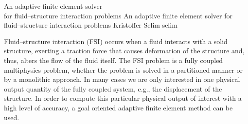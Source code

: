 \bgroup

\setcounter{chapter}{28}
\setcounter{chpnum}{28}

              {An adaptive finite element solver\\ for fluid--structure interaction problems}
              {An adaptive finite element solver for fluid--structure interaction problems}
              {Kristoffer Selim}
              {selim}


\newcommand{\subdt}{\textrm{d}_t}
\newcommand{\divv}{\textrm{div}\;}
\newcommand{\Divv}{\textrm{Div}\;}
\newcommand{\uF}{u_{_{F}}}
\newcommand{\dotuF}{\dot{u}_{_{F}}}
\newcommand{\pF}{p_{_{F}}}
\newcommand{\rhoF}{\rho_{_{F}}}
\newcommand{\sigmaF}{\sigma_{_{F}}}
\newcommand{\sigmaFup}{\sigma_{_{F}}(u_{_{F}}, p_{_{F}})}
\newcommand{\sigmaS}{\sigma_{_{S}}}
\newcommand{\bff}{b_{_{F}}}
\newcommand{\graduF}{\textrm{grad}\;u_{_{F}}}
\newcommand{\US}{U_{_{S}}}
\newcommand{\uS}{u_{_{S}}}
\newcommand{\GradUS}{\textrm{Grad}\;U_{_{S}}}
\newcommand{\ddotUS}{\ddot{U}_{_{S}}}
\newcommand{\ddotuS}{\ddot{u}_{_{S}}}
\newcommand{\PS}{P_{_{S}}}
\newcommand{\rhoS}{\rho_{_{S}}}
\newcommand{\SigmaS}{\Sigma_{_{S}}}
\newcommand{\SigmaSU}{\Sigma_{_{S}}(U_{_{S}})}
\newcommand{\BS}{B_{_{S}}}
\newcommand{\M}{\mathcal{M}}
\newcommand{\E}{\mathcal{E}}
\newcommand{\oF}{\omega_{_{F}}}
\newcommand{\oS}{\omega_{_{S}}}
\newcommand{\OS}{\Omega_{_{S}}}
\newcommand{\OF}{\Omega_{_{F}}}
\newcommand{\PhiS}{\Phi_{_{S}}}
\newcommand{\PhiM}{\Phi_{_{M}}}
\newcommand{\FS}{F_{_{S}}}
\newcommand{\UM}{U_{_{M}}}
\newcommand{\SigmaM}{\Sigma_{_{M}}}
\newcommand{\GradUM}{\textrm{Grad}\;U_{_{M}}}
\newcommand{\UF}{U_{_{F}}}
\newcommand{\PF}{P_{_{F}}}
\newcommand{\AFF}{A_{_{FF}}}
\newcommand{\AFS}{A_{_{FS}}}
\newcommand{\AFM}{A_{_{FM}}}
\newcommand{\ASS}{A_{_{SS}}}
\newcommand{\ASF}{A_{_{SF}}}
\newcommand{\ASM}{A_{_{SM}}}
\newcommand{\AMM}{A_{_{MM}}}
\newcommand{\AMF}{A_{_{MF}}}
\newcommand{\AMS}{A_{_{MS}}}

Fluid--structure interaction (FSI) occurs when a fluid interacts with
a solid structure, exerting a traction force that causes deformation
of the structure and, thus, alters the flow of the fluid itself.  The
FSI problem is a fully coupled multiphysics problem, whether the
problem is solved in a partitioned manner or by a monolithic
approach. In many cases we are only interested in one
physical output quantity of the fully coupled system, e.g., the
displacement of the structure. In order to compute this particular
physical output of interest with a high level of accuracy, a goal
oriented adaptive finite element method can be used.

